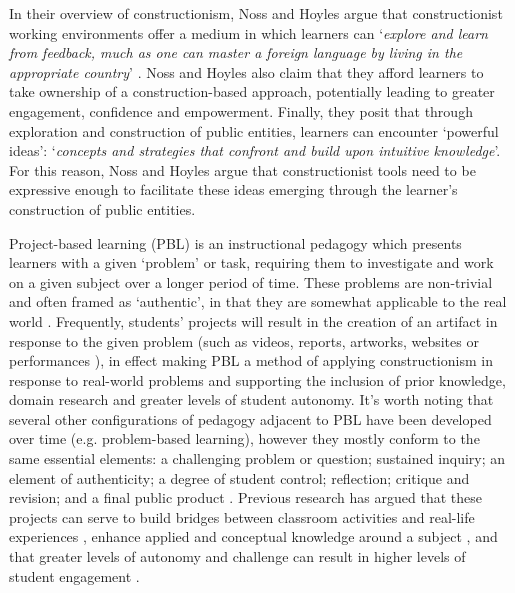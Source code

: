 In their overview of constructionism, Noss and Hoyles argue that constructionist working environments offer a medium in which learners can `\textit{explore and learn from feedback, much as one can master a foreign language by living in the appropriate country}' \citep{Noss2017}. Noss and Hoyles also claim that they afford learners to take ownership of a construction-based approach, potentially leading to greater engagement, confidence and empowerment. Finally, they posit that through exploration and construction of public entities, learners can encounter `powerful ideas': `\textit{concepts and strategies  that confront and build upon intuitive knowledge}'. For this reason, Noss and Hoyles argue that constructionist tools need to be expressive enough to facilitate these ideas emerging through the learner's construction of public entities.

Project-based learning (PBL) is an instructional pedagogy which presents learners with a given `problem' or task, requiring them to investigate and work on a given subject over a longer period of time. These problems are non-trivial and often framed as `authentic', in that they are somewhat applicable to the real world \citep{Blumenfeld1991}. Frequently, students' projects will result in the creation of an artifact in response to the given problem (such as videos, reports, artworks, websites or performances \citep{Holubova2008}), in effect making PBL a method of applying constructionism in response to real-world problems and supporting the inclusion of prior knowledge, domain research and greater levels of student autonomy. It's worth noting that several other configurations of pedagogy adjacent to PBL have been developed over time (e.g. problem-based learning), however they mostly conform to the same essential elements: a challenging problem or question; sustained inquiry; an element of authenticity; a degree of student control; reflection; critique and revision; and a final public product \citep{Larmer2015}. Previous research has argued that these projects can serve to build bridges between classroom activities and real-life experiences \citep{Blumenfeld1991}, enhance applied and conceptual knowledge around a subject \citep{Boaler1999}, and that greater levels of autonomy and challenge can result in higher levels of student engagement \citep{Wurdinger2007}.


